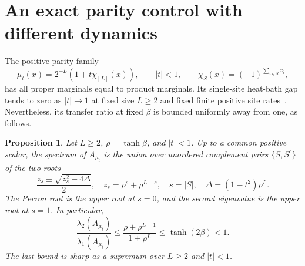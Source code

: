 \documentclass[11pt]{article}
\newtheorem{proposition}[theorem]{Proposition}
\begin{document}
\section{An exact parity control with different dynamics}
The positive parity family
\begin{equation}\label{eq:parity}
 \mu_t(x)=2^{-L}(1+t\chi_{[L]}(x)),\qquad |t|<1,
 \qquad \chi_S(x)=(-1)^{\sum_{i\in S}x_i},
\end{equation}
has all proper marginals equal to product marginals. Its single-site
heat-bath gap tends to zero as $|t|\to1$ at fixed size $L\ge2$ and fixed
finite positive site rates~\cite{ErikssonParity}. Nevertheless, its transfer ratio at fixed
$\beta$ is bounded uniformly away from one, as follows.

\begin{proposition}\label{prop:parity}
Let $L\ge2$, $\rho=\tanh\beta$, and $|t|<1$. Up to a common positive
scalar, the spectrum of $A_{\mu_t}$ is the union over unordered complement
pairs $\{S,S^c\}$ of the two roots
\begin{equation}\label{eq:parityroots}
 \frac{z_s\pm\sqrt{z_s^2-4\Delta}}2,
 \quad z_s=\rho^s+\rho^{L-s},\quad s=|S|,
 \quad \Delta=(1-t^2)\rho^L.
\end{equation}
The Perron root is the upper root at $s=0$, and the second eigenvalue is
the upper root at $s=1$. In particular,
\begin{equation}\label{eq:paritybound}
 \frac{\lambda_2(A_{\mu_t})}{\lambda_1(A_{\mu_t})}
 \le\frac{\rho+\rho^{L-1}}{1+\rho^L}
 \le\tanh(2\beta)<1.
\end{equation}
The last bound is sharp as a supremum over $L\ge2$ and $|t|<1$.
\end{proposition}
\end{document}
